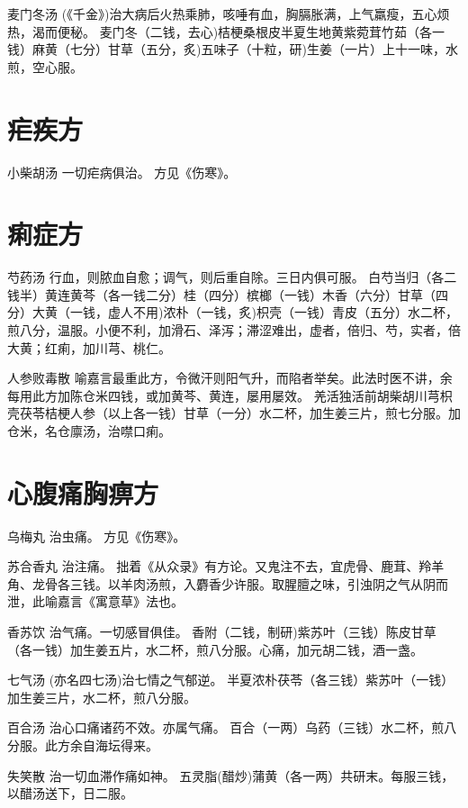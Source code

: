 \documentclass[a4paper,12pt,UTF8,twoside]{ctexbook}
\begin{document}
    麦门冬汤
    (《千金》)治大病后火热乘肺，咳唾有血，胸膈胀满，上气羸瘦，五心烦热，渴而便秘。
    麦门冬（二钱，去心)桔梗桑根皮半夏生地黄紫菀茸竹茹（各一钱）麻黄（七分）甘草（五分，炙)五味子（十粒，研)生姜（一片）上十一味，水煎，空心服。
    
    \chapter{疟疾方}
    
    小柴胡汤
    一切疟病俱治。
    方见《伤寒》。
    
    \chapter{痢症方}	
    
    芍药汤
    行血，则脓血自愈；调气，则后重自除。三日内俱可服。
    白芍当归（各二钱半）黄连黄芩（各一钱二分）桂（四分）槟榔（一钱）木香（六分）甘草（四分）大黄（一钱，虚人不用)浓朴（一钱，炙)枳壳（一钱）青皮（五分）水二杯，煎八分，温服。小便不利，加滑石、泽泻；滞涩难出，虚者，倍归、芍，实者，倍大黄；红痢，加川芎、桃仁。
    
    人参败毒散
    喻嘉言最重此方，令微汗则阳气升，而陷者举矣。此法时医不讲，余每用此方加陈仓米四钱，或加黄芩、黄连，屡用屡效。
    羌活独活前胡柴胡川芎枳壳茯苓桔梗人参（以上各一钱）甘草（一分）水二杯，加生姜三片，煎七分服。加仓米，名仓廪汤，治噤口痢。
    
    \chapter{心腹痛胸痹方}
     乌梅丸
    治虫痛。
    方见《伤寒》。
    
    苏合香丸
    治注痛。
    拙着《从众录》有方论。又鬼注不去，宜虎骨、鹿茸、羚羊角、龙骨各三钱。以羊肉汤煎，入麝香少许服。取腥膻之味，引浊阴之气从阴而泄，此喻嘉言《寓意草》法也。
    
    香苏饮
    治气痛。一切感冒俱佳。
    香附（二钱，制研)紫苏叶（三钱）陈皮甘草（各一钱）加生姜五片，水二杯，煎八分服。心痛，加元胡二钱，酒一盏。
    
    七气汤
    (亦名四七汤)治七情之气郁逆。
    半夏浓朴茯苓（各三钱）紫苏叶（一钱）加生姜三片，水二杯，煎八分服。
    
    百合汤
    治心口痛诸药不效。亦属气痛。
    百合（一两）乌药（三钱）水二杯，煎八分服。此方余自海坛得来。
    
    失笑散
    治一切血滞作痛如神。
    五灵脂(醋炒)蒲黄（各一两）共研末。每服三钱，以醋汤送下，日二服。
    
\end{document}
